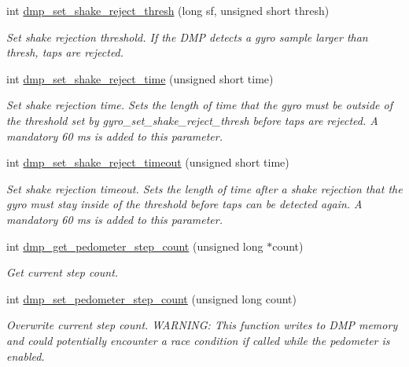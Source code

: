 \begin{DoxyCompactItemize}
int \hyperlink{group___d_r_i_v_e_r_s_ga62efdae1330d5bcaf4c75b069ded0ed0}{dmp\+\_\+set\+\_\+shake\+\_\+reject\+\_\+thresh} (long sf, unsigned short thresh)
\begin{DoxyCompactList}\small\item\em Set shake rejection threshold. If the D\+MP detects a gyro sample larger than {\itshape thresh}, taps are rejected. \end{DoxyCompactList}\item 
int \hyperlink{group___d_r_i_v_e_r_s_ga09d7a6d90e1bd2e907f1866d850c5608}{dmp\+\_\+set\+\_\+shake\+\_\+reject\+\_\+time} (unsigned short time)
\begin{DoxyCompactList}\small\item\em Set shake rejection time. Sets the length of time that the gyro must be outside of the threshold set by {\itshape gyro\+\_\+set\+\_\+shake\+\_\+reject\+\_\+thresh} before taps are rejected. A mandatory 60 ms is added to this parameter. \end{DoxyCompactList}\item 
int \hyperlink{group___d_r_i_v_e_r_s_ga5d44d1a32535000e6902cdc5224d1b54}{dmp\+\_\+set\+\_\+shake\+\_\+reject\+\_\+timeout} (unsigned short time)
\begin{DoxyCompactList}\small\item\em Set shake rejection timeout. Sets the length of time after a shake rejection that the gyro must stay inside of the threshold before taps can be detected again. A mandatory 60 ms is added to this parameter. \end{DoxyCompactList}\item 
int \hyperlink{group___d_r_i_v_e_r_s_gad8f4d1a93e0f03d950559501c5a7255b}{dmp\+\_\+get\+\_\+pedometer\+\_\+step\+\_\+count} (unsigned long $\ast$count)
\begin{DoxyCompactList}\small\item\em Get current step count. \end{DoxyCompactList}\item 
int \hyperlink{group___d_r_i_v_e_r_s_ga568562c19998f585b1d2ba056cd209db}{dmp\+\_\+set\+\_\+pedometer\+\_\+step\+\_\+count} (unsigned long count)
\begin{DoxyCompactList}\small\item\em Overwrite current step count. W\+A\+R\+N\+I\+NG\+: This function writes to D\+MP memory and could potentially encounter a race condition if called while the pedometer is enabled. \end{DoxyCompactList}\item 

\end{DoxyCompactItemize}
